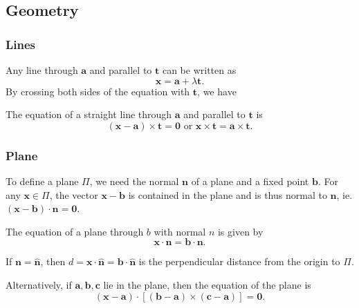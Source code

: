\documentclass[a4paper]{article}
\begin{document}
\subsection{Geometry}
\subsubsection{Lines}
Any line through $\mathbf{a}$ and parallel to $\mathbf{t}$ can be written as
\[
  \mathbf{x} = \mathbf{a} + \lambda\mathbf{t}.
\]
By crossing both sides of the equation with $\mathbf{t}$, we have
\begin{thm} The equation of a straight line through $\mathbf{a}$ and parallel to $\mathbf{t}$ is
  \[
    \mathbf{(x - a)\times t = 0}\text{ or }\mathbf{x\times t = a\times t}.
  \]
\end{thm}
\subsubsection{Plane}
To define a plane $\Pi$, we need the normal $\mathbf{n}$ of a plane and a fixed point $\mathbf{b}$.  For any $\mathbf{x}\in \Pi$, the vector $\mathbf{x - b}$ is contained in the plane and is thus normal to $\mathbf{n}$, ie. $\mathbf{(x - b)\cdot n = 0}$.
\begin{thm}
  The equation of a plane through $b$ with normal $n$ is given by
  \[
    \mathbf{x\cdot n = b\cdot n}.
  \]
\end{thm}
If $\mathbf{n = \hat n}$, then $d = \mathbf{x\cdot\hat{n} = b\cdot\hat{n}}$ is the perpendicular distance from the origin to $\Pi$.

Alternatively, if $\mathbf{a, b, c}$ lie in the plane, then the equation of the plane is
\[
  \mathbf{(x - a)\cdot [(b - a)\times (c - a)] = 0}.
\]
\end{document}
